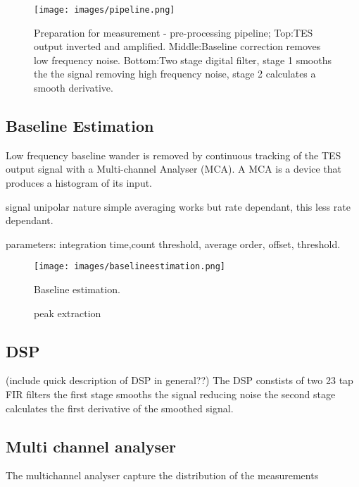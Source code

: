 \documentclass{article}
\begin{document}
\begin{figure}[!hpbt]
  \centering
  \texttt{[image: images/pipeline.png]}
  \caption{
    Preparation for measurement - pre-processing pipeline; Top:TES output
    inverted and amplified.
    Middle:Baseline correction removes low frequency noise. 
    Bottom:Two stage digital filter,
    stage 1 smooths the the signal removing high frequency noise, stage 2
    calculates a smooth derivative.
  }
  \label{fig:pipeline}
\end{figure}

\clearpage


\subsection{Baseline Estimation}
Low frequency baseline wander is removed by continuous tracking of the TES
output signal with a Multi-channel Analyser (MCA). A MCA is a device that
produces a histogram of its input. 

signal unipolar nature simple averaging works but rate dependant, this less
rate dependant.

parameters: integration time,count threshold, average order, offset, threshold.


\begin{figure}[!hpbt]
  \centering
  \texttt{[image: images/baselineestimation.png]}
  \caption{
    Baseline estimation. 
  }
  \label{fig:baselineestimation}
\end{figure}


\begin{figure}[!hpbt]
  \centering
  
  \caption{
    peak extraction
  }
  \label{fig:peakextraction}
\end{figure}



\subsection{DSP}
(include quick description of DSP in general??)
The DSP constists of two 23 tap FIR filters the first stage smooths the signal
reducing noise the second stage calculates the first derivative of the smoothed
signal.

\subsection{Multi channel analyser}
The multichannel analyser capture the distribution of the measurements
\end{document}
